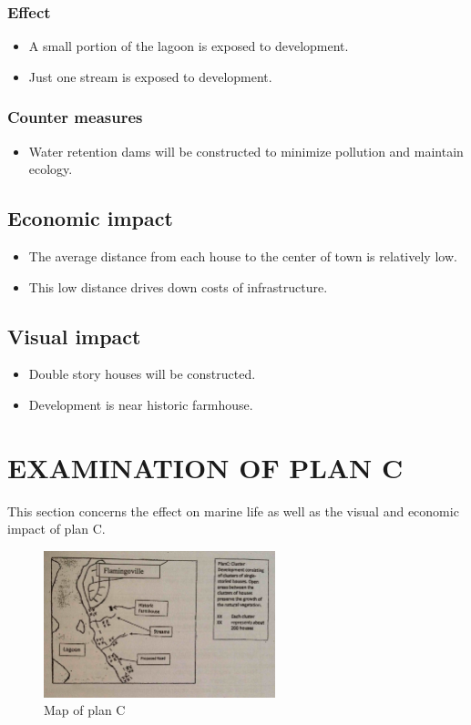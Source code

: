 \documentclass{article}
\begin{document}
\subsubsection{Effect}
\begin{itemize}
	\item A small portion of the lagoon is exposed to development.
	\item Just one stream is exposed to development.
\end{itemize}

\subsubsection{Counter measures}
\begin{itemize}
	\item Water retention dams will be constructed to minimize pollution and maintain ecology.
\end{itemize}

\subsection{Economic impact}
\begin{itemize}
	\item The average distance from each house to the center of town is relatively low.
	\item This low distance drives down costs of infrastructure.
\end{itemize}

\subsection{Visual impact}
\begin{itemize}
	\item Double story houses will be constructed.
	\item Development is near historic farmhouse.
\end{itemize}

\newpage
\section{EXAMINATION OF PLAN C}
This section concerns the effect on marine life as well as the visual and economic impact of plan C.

\begin{figure}[h!]
	\centering
	\includegraphics[width=0.6\textwidth]{plan_c}
	\caption{Map of plan C}
\end{figure}
\end{document}
